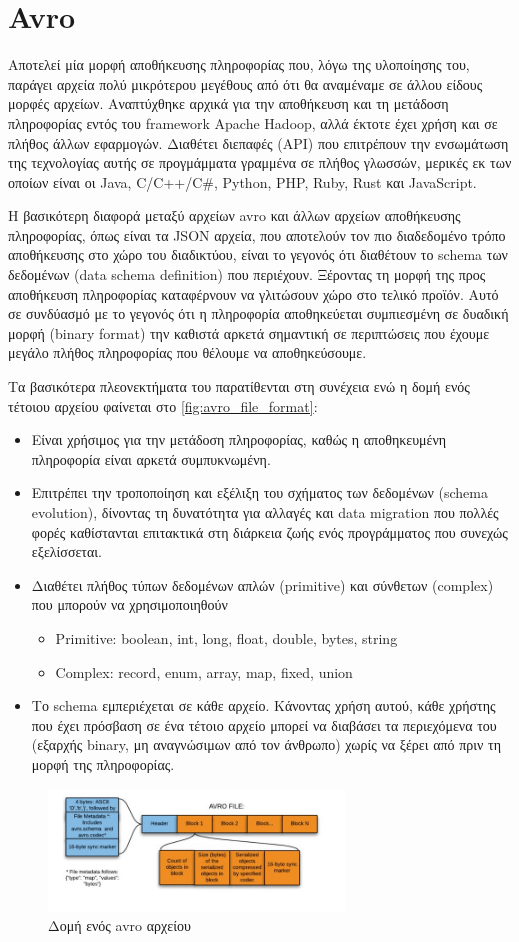 \section{Avro}
\label{section:avro}

Αποτελεί μία μορφή αποθήκευσης πληροφορίας που, λόγω της υλοποίησης του, παράγει αρχεία
πολύ μικρότερου μεγέθους από ότι θα αναμέναμε σε άλλου είδους μορφές αρχείων. Αναπτύχθηκε αρχικά για
την αποθήκευση και τη μετάδοση πληροφορίας εντός του framework Apache Hadoop, αλλά έκτοτε
έχει χρήση και σε πλήθος άλλων εφαρμογών. Διαθέτει διεπαφές (API) που επιτρέπουν την ενσωμάτωση της τεχνολογίας αυτής σε
προγμάμματα γραμμένα σε πλήθος γλωσσών, μερικές εκ των οποίων είναι οι Java, C/C++/C\#, Python, PHP, Ruby, Rust και JavaScript.

Η βασικότερη διαφορά μεταξύ αρχείων avro και άλλων αρχείων αποθήκευσης πληροφορίας, όπως είναι τα JSON αρχεία,
που αποτελούν τον πιο διαδεδομένο τρόπο αποθήκευσης στο χώρο του διαδικτύου, είναι το γεγονός
ότι διαθέτουν το schema των δεδομένων (data schema definition) που περιέχουν. Ξέροντας τη μορφή της προς αποθήκευση πληροφορίας
καταφέρνουν να γλιτώσουν χώρο στο τελικό προϊόν. Αυτό σε συνδύασμό με το γεγονός ότι η πληροφορία αποθηκεύεται
συμπιεσμένη σε δυαδική μορφή (binary format) την καθιστά αρκετά σημαντική σε περιπτώσεις που έχουμε μεγάλο πλήθος πληροφορίας
που θέλουμε να αποθηκεύσουμε.

Τα βασικότερα πλεονεκτήματα του παρατίθενται στη συνέχεια ενώ η δομή ενός τέτοιου αρχείου φαίνεται στο \autoref{fig:avro_file_format}:

\begin{itemize}
	\item Είναι χρήσιμος για την μετάδοση πληροφορίας, καθώς η αποθηκευμένη πληροφορία είναι
		αρκετά συμπυκνωμένη.
	\item Επιτρέπει την τροποποίηση και εξέλιξη του σχήματος των δεδομένων (schema evolution), δίνοντας
		τη δυνατότητα για αλλαγές και data migration που πολλές φορές καθίστανται επιτακτικά 
		στη διάρκεια ζωής ενός προγράμματος που συνεχώς εξελίσσεται.
	\item Διαθέτει πλήθος τύπων δεδομένων απλών (primitive) και σύνθετων (complex) που μπορούν να χρησιμοποιηθούν
		\begin{itemize}
			\item Primitive: boolean, int, long, float, double, bytes, string
			\item Complex: record, enum, array, map, fixed, union 
		\end{itemize}
	\item Το schema εμπεριέχεται σε κάθε αρχείο. Κάνοντας χρήση αυτού, κάθε χρήστης που έχει
		πρόσβαση σε ένα τέτοιο αρχείο μπορεί να διαβάσει τα περιεχόμενα του (εξαρχής binary, μη αναγνώσιμων από τον άνθρωπο)
		χωρίς να ξέρει από πριν τη μορφή της πληροφορίας. 
\end{itemize}


\begin{figure}[!ht]
	\centering
	\includegraphics[width=0.7\textwidth]{./images/chapter2/avro_file_format.png}
	\caption[Δομή ενός avro αρχείου]{Δομή ενός avro αρχείου}
	\label{fig:avro_file_format}
\end{figure}
